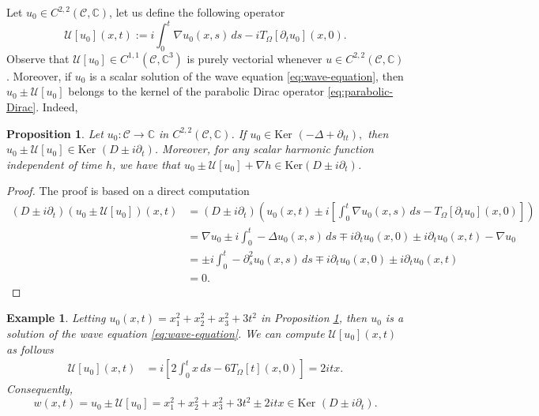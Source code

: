 \documentclass[12pt]{article}
\newtheorem{example}[theorem]{Example}
\newtheorem{proposition}[theorem]{Proposition}
\def\C{\mathbb{C}}
\def\C{\mathbb{C}}
\begin{document}
Let $u_0\in C^{2,2}(\mathscr{C},\mathbb{C})$, let us define the following operator 
\begin{equation}\label{eq:operator-comp}
    \mathscr{U}[u_0](x,t):=i\int_0^t \nabla u_0(x,s)\, ds-i T_\Omega[\partial_t u_0](x,0).
\end{equation}
Observe that $\mathscr{U}[u_0]\in C^{1,1}(\mathscr{C}, \mathbb{C}^3)$ is purely vectorial whenever $u\in C^{2,2}(\mathscr{C},\mathbb{C})$. Moreover, if $u_0$ is a scalar solution of the wave equation \eqref{eq:wave-equation}, then $u_0\pm \mathscr{U}[u_0]$ belongs to the kernel of the parabolic Dirac operator \eqref{eq:parabolic-Dirac}. Indeed,
\begin{proposition}\label{prop:harmonic-conjugates}
    Let $u_0:\mathscr{C}\to\C$ in $C^{2,2}(\mathscr{C},\mathbb{C})$. If $u_0\in\text{Ker }(-\Delta+\partial_{tt}),$ then $u_0\pm\mathscr{U}[u_0]\in\text{Ker }(D\pm i\partial_t)$. Moreover, for any scalar harmonic function independent of time $h$, we have that $u_0\pm\mathscr{U}[u_0]+\nabla h\in\text{Ker}(D\pm i\partial_t)$.
\end{proposition}

\begin{proof} The proof is based on a direct computation
    \begin{align*}
        (D\pm i\partial_t)\left(u_0\pm \mathscr{U}[u_0]\right)(x,t)&=(D\pm i\partial_t)\left(u_0(x,t)\pm i\left[\int_0^t\nabla u_0(x,s)\, ds-T_\Omega[\partial_tu_0](x,0)\right]\right)\\
        &=\nabla u_0\pm i\int_0^t-\Delta u_0(x,s)\, ds\mp i \partial_tu_0(x,0)\pm i\partial_tu_0(x,t) - \nabla u_0\\
        &=\pm i\int_0^t-\partial_s^2 u_0(x,s)\, ds\mp i \partial_tu_0(x,0)\pm i\partial_tu_0(x,t)\\
        &=0.
    \end{align*}
\end{proof}
\begin{example}
Letting $u_0(x,t)=x_1^2+x_2^2+x_3^2+3t^2$ in Proposition \ref{prop:harmonic-conjugates}, then $u_0$ is a solution of the wave equation \eqref{eq:wave-equation}. We can compute $\mathscr{U}[u_0](x,t)$ as follows  
\begin{align*}
        \mathscr{U}[u_0](x,t)&=i\left[2\int_0^t  x \,ds-6T_\Omega[t](x,0)\right]=2itx.
\end{align*}
Consequently,
    \[w(x,t)=u_0\pm\mathscr{U}[u_0]=x_1^2+x_2^2+x_3^2+3t^2 \pm 2itx\in \text{Ker }(D\pm i\partial_t).\]
\end{example}
\end{document}

